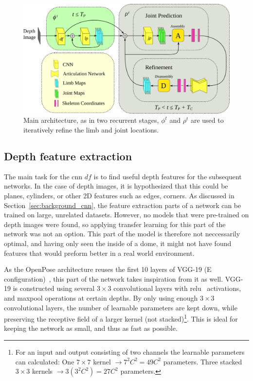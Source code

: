 \begin{figure}[h]
  \centering
  \includegraphics[width=\textwidth]{img/architecture_main}
  \caption[Main architecture]{Main architecture, as in \cite{cao2017realtime} two recurrent stages, $\phi^{t}$ and $\rho^{t}$ are used to iteratively refine the limb and joint locations.}
  \label{fig:arch_main}
\end{figure}

\subsection{Depth feature extraction}\label{subsec:depth_feature}

The main task for the \gls{cnn} $df$ is to find useful depth features for the subsequent networks. In the case of depth images, it is hypothesized that this could be planes, cylinders, or other 2D features such as edges, corners. As discussed in Section~\ref{sec:background_cnn}, the feature extraction parts of a network can be trained on large, unrelated datasets. However, no models that were pre-trained on depth images were found, so applying transfer learning for this part of the network was not an option. This part of the model is therefore not neccessarily optimal, and having only seen the inside of a dome, it might not have found features that would preform better in a real world environment.

As the OpenPose architecture reuses the first 10 layers of VGG-19 (E configuration)~\cite{simonyan2015deep},  this part of the network takes inspiration from it as well. VGG-19 is constructed using several $3 \times 3$ convolutional layers with \gls{relu}~\cite{nairHintonRelu} activations, and maxpool operations at certain depths. By only using enough $3 \times 3$ convolutional layers, the number of learnable parameters are kept down, while preserving the receptive field of a larger kernel (not stacked)\footnote{For an input and output consisting of two channels the learnable parameters can calculated: One $7 \times 7$ kernel $\rightarrow 7^{2}C^{2} = 49C^{2}$ parameters. Three stacked $3 \times 3$ kernels $\rightarrow 3(3^{2}C^{2}) = 27C^{2}$ parameters.}. This is ideal for keeping the network as small, and thus as fast as possible. %

